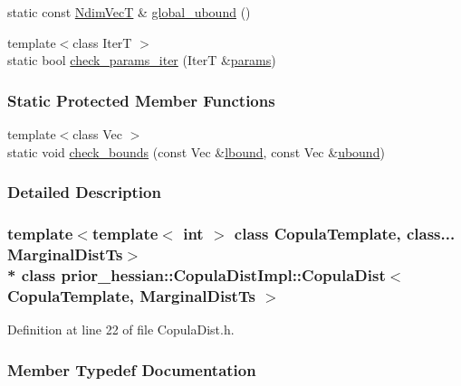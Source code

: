 \begin{DoxyCompactItemize}
\item 
static const \hyperlink{classprior__hessian_1_1CopulaDistImpl_1_1CopulaDist_a94fa53fddcc81dcefec387f68294472d}{Ndim\+VecT} \& \hyperlink{classprior__hessian_1_1CopulaDistImpl_1_1CopulaDist_aad110f1a85e7611fd098aa51c2104015}{global\+\_\+ubound} ()
\item 
{\footnotesize template$<$class IterT $>$ }\\static bool \hyperlink{classprior__hessian_1_1CopulaDistImpl_1_1CopulaDist_afec9ea96312bb7b4e4d0fc5afe95ec58}{check\+\_\+params\+\_\+iter} (IterT \&\hyperlink{classprior__hessian_1_1CopulaDistImpl_1_1CopulaDist_a0ca7e24c5dba13279c613c95434b46a2}{params})
\end{DoxyCompactItemize}
\subsubsection*{Static Protected Member Functions}
\begin{DoxyCompactItemize}
\item 
{\footnotesize template$<$class Vec $>$ }\\static void \hyperlink{classprior__hessian_1_1MultivariateDist_afdc57126708d3ef19be759496aceeda6}{check\+\_\+bounds} (const Vec \&\hyperlink{classprior__hessian_1_1CopulaDistImpl_1_1CopulaDist_a4b7bf2f72c81574d9e19a2cd629f264d}{lbound}, const Vec \&\hyperlink{classprior__hessian_1_1CopulaDistImpl_1_1CopulaDist_abdb39f0c5f7f5f4b16bf501e6083d5b6}{ubound})
\end{DoxyCompactItemize}


\subsubsection{Detailed Description}
\subsubsection*{template$<$template$<$ int $>$ class Copula\+Template, class... Marginal\+Dist\+Ts$>$\\*
class prior\+\_\+hessian\+::\+Copula\+Dist\+Impl\+::\+Copula\+Dist$<$ Copula\+Template, Marginal\+Dist\+Ts $>$}



Definition at line 22 of file Copula\+Dist.\+h.



\subsubsection{Member Typedef Documentation}
